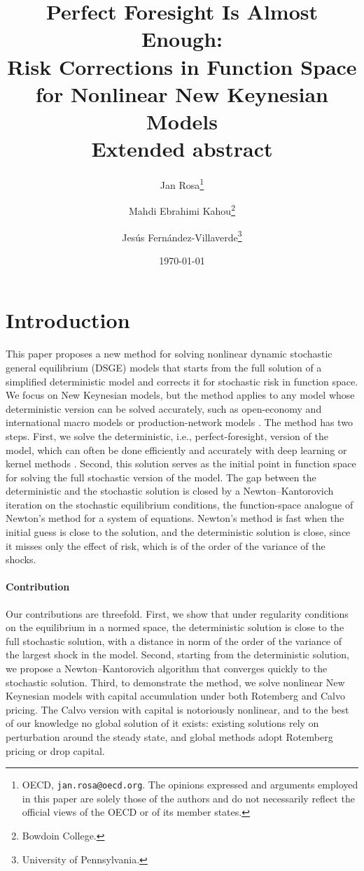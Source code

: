 \documentclass[11pt]{article}
\title{Perfect Foresight Is Almost Enough:\\ Risk Corrections in Function Space for Nonlinear New Keynesian Models\\[0.6em] {\large\bfseries Extended abstract}}
\author{Jan Rosa\thanks{OECD, \texttt{jan.rosa@oecd.org}. The opinions expressed and arguments employed in this paper are solely those of the authors and do not necessarily reflect the official views of the OECD or of its member states.}
\and Mahdi Ebrahimi Kahou\thanks{Bowdoin College.}
\and Jes\'us Fern\'andez-Villaverde\thanks{University of Pennsylvania.}}
\date{\today}
\begin{document}
\maketitle

\section{Introduction}
This paper proposes a new method for solving nonlinear dynamic stochastic general
equilibrium (DSGE) models that starts from the full solution of
a simplified deterministic model and corrects it for stochastic risk in function space.
We focus on New Keynesian models, but the method applies to any model whose
deterministic version can be solved accurately, such as open-economy and
international macro models or production-network models \citep{fernandezvillaverde2026production}. The method has
two steps. First, we solve the deterministic, i.e., perfect-foresight, version
of the model, which can often be done efficiently and accurately with deep
learning or kernel methods \citep{kahou2024spooky, kahou2026kernel}. Second,
this solution serves as the initial point in function space for solving the
full stochastic version of the model. The gap between the deterministic and
the stochastic solution is closed by a
Newton--Kantorovich iteration on the stochastic equilibrium conditions, the
function-space analogue of Newton's method for a system of equations. Newton's
method is fast when the initial guess is close to the solution, and the
deterministic solution is close, since it misses only the effect of risk, which
is of the order of the variance of the shocks.

\paragraph{Contribution} Our contributions are threefold. First, we show that under regularity
conditions on the equilibrium in a normed space, the deterministic solution
is close to the full stochastic solution, with a distance in norm of the
order of the variance of the largest shock in the model. Second,
starting from the deterministic solution, we propose a Newton--Kantorovich
algorithm that converges quickly to the stochastic solution. Third, to demonstrate
the method, we solve nonlinear New Keynesian models with capital accumulation under
both Rotemberg and Calvo pricing. The Calvo version with capital is notoriously nonlinear, and to the
best of our knowledge no global solution of it exists: existing solutions rely
on perturbation around the steady state, and global methods adopt Rotemberg
pricing or drop capital.
\end{document}
